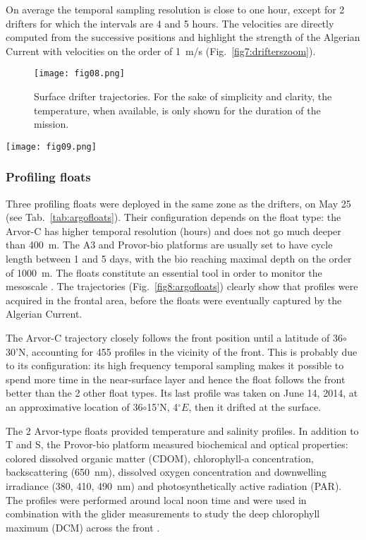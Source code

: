 \documentclass[essd]{copernicus}
\begin{document}
On average the temporal sampling resolution is close to one hour, except for 2 drifters for which the intervals are 4 and 5 hours. The velocities are directly computed from the successive positions and highlight the strength of the Algerian Current with velocities on the order of 1~m/s (Fig.~\ref{fig7:drifterszoom}).    

\begin{figure}[t]
\texttt{[image: fig08.png]}
\caption{Surface drifter trajectories. For the sake of simplicity and clarity, the temperature, when available, is only shown for the duration of the mission.\label{fig3:drifters}}
\end{figure}

\begin{figure*}[h]
\texttt{[image: fig09.png]}
\caption{Drifter temperature (left-hand side) and velocity in the area of study.\label{fig7:drifterszoom}}
\end{figure*}


\subsubsection{Profiling floats}

Three profiling floats were deployed in the same zone as the drifters, on May 25 (see Tab.~\ref{tab:argofloats}). Their configuration depends on the float type: the Arvor-C has higher temporal resolution (hours) and does not go much deeper than 400~m. The A3 and Provor-bio platforms are usually set to have cycle length between 1 and 5 days, with the bio reaching maximal depth on the order of 1000~m. The floats constitute an essential tool in order to monitor the mesoscale \citep{SANCHEZROMAN17}. The trajectories (Fig.~\ref{fig8:argofloats}) clearly show that profiles were acquired in the frontal area, before the floats were eventually captured by the Algerian Current. 

The Arvor-C trajectory closely follows the front position until a latitude of 36$\circ$30'N, accounting for 455 profiles in the vicinity of the front. This is probably due to its configuration: its high frequency temporal sampling makes it possible to spend more time in the near-surface layer and hence the float follows the front better than the 2 other float types. Its last profile was taken on June 14, 2014, at an approximative location of 36$\circ$15'N, 4$^{\circ}E$, then it drifted at the surface.

The 2 Arvor-type floats provided temperature and salinity profiles. In addition to T and S, the Provor-bio platform measured biochemical and optical properties: colored dissolved organic matter (CDOM), chlorophyll-a concentration, backscattering (650~nm), dissolved oxygen concentration and downwelling  irradiance (380, 410, 490~nm) and photosynthetically active radiation (PAR). The profiles were performed around local noon time and were used in combination with the glider measurements to study the deep chlorophyll maximum (DCM) across the front \citep{OLITA17}.
\end{document}
